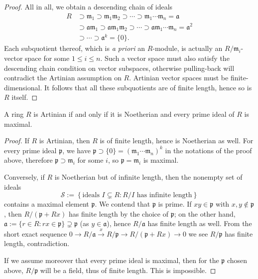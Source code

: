 \begin{proof}
	All in all, we obtain a descending chain of ideals
	\begin{align*}
		R & \supset \mathfrak{m}_1 \supset \mathfrak{m}_1 \mathfrak{m}_2 \supset \cdots \supset \mathfrak{m}_1 \cdots \mathfrak{m}_n = \mathfrak{a} \\
		& \supset \mathfrak{a} \mathfrak{m}_1 \supset \mathfrak{a} \mathfrak{m}_1 \mathfrak{m}_2 \supset \cdots \supset \mathfrak{a} \mathfrak{m}_1 \cdots \mathfrak{m}_n = \mathfrak{a}^2 \\
		& \supset \cdots \supset \mathfrak{a}^k = \{0\}.
	\end{align*}
	Each subquotient thereof, which is \textit{a priori} an $R$-module, is actually an $R/\mathfrak{m}_i$-vector space for some $1 \leq i \leq n$. Such a vector space must also satisfy the descending chain condition on vector subspaces, otherwise pulling-back will contradict the Artinian assumption on $R$. Artinian vector spaces must be finite-dimensional. It follows that all these subquotients are of finite length, hence so is $R$ itself.
\end{proof}

\begin{corollary}\label{prop:Artinian-dim-0}
	A ring $R$ is Artinian if and only if it is Noetherian and every prime ideal of $R$ is maximal.
\end{corollary}
\begin{proof}
	If $R$ is Artinian, then $R$ is of finite length, hence is Noetherian as well. For every prime ideal $\mathfrak{p}$, we have $\mathfrak{p} \supset \{0\} = (\mathfrak{m}_1 \cdots \mathfrak{m}_n)^k$ in the notations of the proof above, therefore $\mathfrak{p} \supset \mathfrak{m}_i$ for some $i$, so $\mathfrak{p} = \mathfrak{m}_i$ is maximal.

	Conversely, if $R$ is Noetherian but of infinite length, then the nonempty set of ideals
	\[ \mathcal{S} := \left\{ \text{ideals } I \subsetneq R: R/I \text{ has infinite length} \right\} \]
	contains a maximal element $\mathfrak{p}$. We contend that $\mathfrak{p}$ is prime. If $xy \in \mathfrak{p}$ with $x,y \notin \mathfrak{p}$, then $R/(\mathfrak{p}+Rx)$ has finite length by the choice of $\mathfrak{p}$; on the other hand, $\mathfrak{a} := \{ r \in R: rx \in \mathfrak{p}\} \supsetneq \mathfrak{p}$ (as $y \in \mathfrak{a}$), hence $R/\mathfrak{a}$ has finite length as well. From the short exact sequence $0 \to R/\mathfrak{a} \xrightarrow{x} R/\mathfrak{p} \to R/(\mathfrak{p}+Rx) \to 0$ we see $R/\mathfrak{p}$ has finite length, contradiction.
	
	If we assume moreover that every prime ideal is maximal, then for the $\mathfrak{p}$ chosen above, $R/\mathfrak{p}$ will be a field, thus of finite length. This is impossible.
\end{proof}

